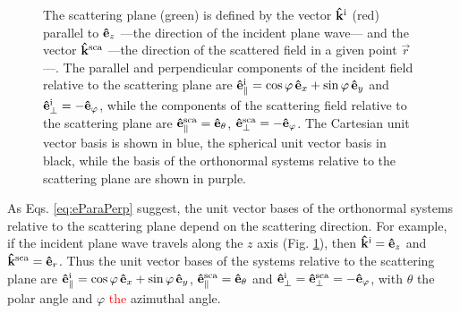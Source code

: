 \begin{figure}[!bht]\centering
	
    \caption[Scattering plane unit vector systems]{The scattering plane (green) is defined by the vector $\vu{k}^\text{i}$ (red) parallel to $\vu{e}_z$ ---the direction of the incident plane wave--- and the vector $\vu{k}^\text{sca}$ ---the direction of the scattered field in a given point $\vec{r}$---. The parallel and perpendicular components of the incident field relative to the scattering plane are $\vu{e}_\parallel^\text{i} = \cos\varphi\,\vu{e}_x +\sin\varphi\,\vu{e}_y$ and  $\vu{e}_\perp^\text{i} = -\vu{e}_\varphi$, while the components of the scattering field relative to the scattering plane are $\vu{e}_\parallel^\text{sca} = \vu{e}_\theta$, $\vu{e}_\perp^\text{sca} = - \vu{e}_\varphi$. The Cartesian unit vector basis is shown in blue, the spherical unit vector basis in black, while the basis of the orthonormal systems relative to the scattering plane are shown in purple. }
    \label{fig:ScatPlane}
\end{figure}
%
\noindent
As Eqs. \eqref{eq:eParaPerp} suggest, the unit vector bases of the orthonormal systems relative to the scattering plane depend on the scattering direction. For example, if the incident plane wave travels along the $z$ axis (Fig. \ref{fig:ScatPlane}), then $\vu{k}^\text{i} = \vu{e}_z$ and $\vu{k}^\text{sca} = \vu{e}_r$. Thus the unit vector bases of the systems relative to the scattering plane are   $\vu{e}_\parallel^\text{i} = \cos\varphi\, \vu{e}_x +\sin\varphi\, \vu{e}_y$, $\vu{e}_\parallel^\text{sca} = \vu{e}_\theta$ and $\vu{e}_\perp^\text{i} = \vu{e}_\perp^\text{sca}  = - \vu{e}_\varphi$, with $\theta$ the polar angle and $\varphi$ \textcolor{red}{the} azimuthal angle.

